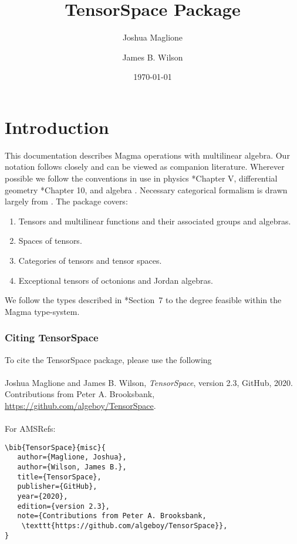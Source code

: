 \documentclass{documentation}
\title{TensorSpace Package}
\author{Joshua Maglione}
\author{James B. Wilson}
\date{\today}
\begin{document}
\frontmatter

\dominitoc
\maketitle
\tableofcontents

\mainmatter

\chapter{Introduction}

This documentation describes Magma operations with multilinear algebra. Our
notation follows \cite{FMW:densors} closely and can be viewed as companion
literature. Wherever possible we follow the conventions in use in physics
\cite{Weyl}*{Chapter V}, differential geometry \cite{Lee:geom}*{Chapter 10}, and
algebra \cite{Landsberg:tensors}. Necessary categorical formalism is drawn
largely from \cite{Wilson:division}. The package covers:
\begin{enumerate}
\item Tensors and multilinear functions and their associated groups and algebras.
\item Spaces of tensors.
\item Categories of tensors and tensor spaces.
\item Exceptional tensors of octonions and Jordan algebras.
\end{enumerate}
We follow the types described in \cite{FMW:densors}*{Section~7} to the degree
feasible within the Magma type-system.
\bigskip

\subsection*{Citing TensorSpace} 
To cite the TensorSpace package, please use the following\\
\\
Joshua Maglione and James B. Wilson, \emph{TensorSpace}, version 2.3, GitHub,
2020. Contributions from Peter A. Brooksbank,
\url{https://github.com/algeboy/TensorSpace}. \\
\\
For AMSRefs:
\begin{verbatim}
\bib{TensorSpace}{misc}{
   author={Maglione, Joshua},
   author={Wilson, James B.},
   title={TensorSpace},
   publisher={GitHub},
   year={2020},
   edition={version 2.3},
   note={Contributions from Peter A. Brooksbank, 
    \texttt{https://github.com/algeboy/TensorSpace}},
}
\end{verbatim}
\end{document}
